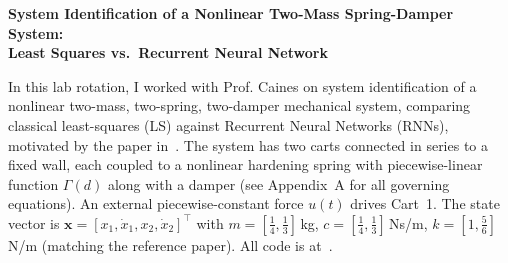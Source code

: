 \documentclass[12pt]{article}
\begin{document}
\begin{center}
{\fontsize{14}{16.8}\selectfont
  \textbf{System Identification of a Nonlinear Two-Mass Spring-Damper System:\\[2pt]
          Least Squares vs.\ Recurrent Neural Network}}
\end{center}
\vspace{2pt}


In this lab rotation, I worked with Prof. Caines on system identification of a nonlinear two-mass, two-spring,
two-damper mechanical system, comparing classical least-squares (LS) against Recurrent Neural Networks (RNNs), motivated by the paper in~\cite{revay2021}.
The system has two carts connected in series to a fixed wall, each coupled to a nonlinear hardening spring with piecewise-linear function $\Gamma(d)$ along with a damper (see Appendix~A for all governing equations). An external piecewise-constant force $u(t)$ drives Cart~1.
The state vector is $\mathbf{x}=[x_1,\dot{x}_1,x_2,\dot{x}_2]^{\top}$ with
$m=[\tfrac{1}{4},\tfrac{1}{3}]$\,kg, $c=[\tfrac{1}{4},\tfrac{1}{3}]$\,Ns/m,
$k=[1,\tfrac{5}{6}]$\,N/m (matching the reference paper). All code is at~\cite{code}.
\end{document}

